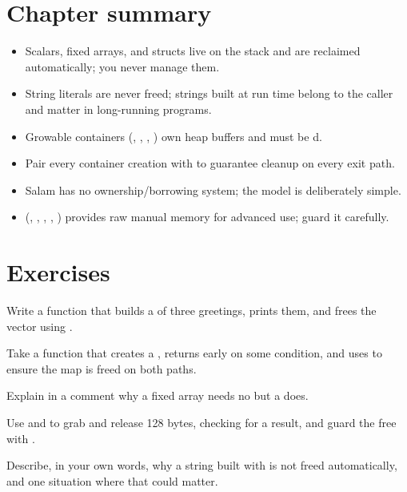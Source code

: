 \section{Chapter summary}

\begin{itemize}[leftmargin=1.4em]
  \item Scalars, fixed arrays, and structs live on the stack and are reclaimed
        automatically; you never manage them.
  \item String literals are never freed; strings built at run time belong to
        the caller and matter in long-running programs.
  \item Growable containers (, , ,
        ) own heap buffers and must be d.
  \item Pair every container creation with  to guarantee
        cleanup on every exit path.
  \item Salam has no ownership/borrowing system; the model is deliberately
        simple.
  \item {} (, , , ,
        ) provides raw manual memory for advanced use; guard it
        carefully.
\end{itemize}

\section{Exercises}

\exercise Write a function that builds a  of three greetings,
prints them, and frees the vector using .

\exercise Take a function that creates a , returns early on some
condition, and uses  to ensure the map is freed on both paths.

\exercise Explain in a comment why a fixed array  needs no
 but a  does.

\exercise Use  and  to grab and release 128
bytes, checking for a  result, and guard the free with .

\exercise Describe, in your own words, why a string built with \code{+} is not
freed automatically, and one situation where that could matter.
